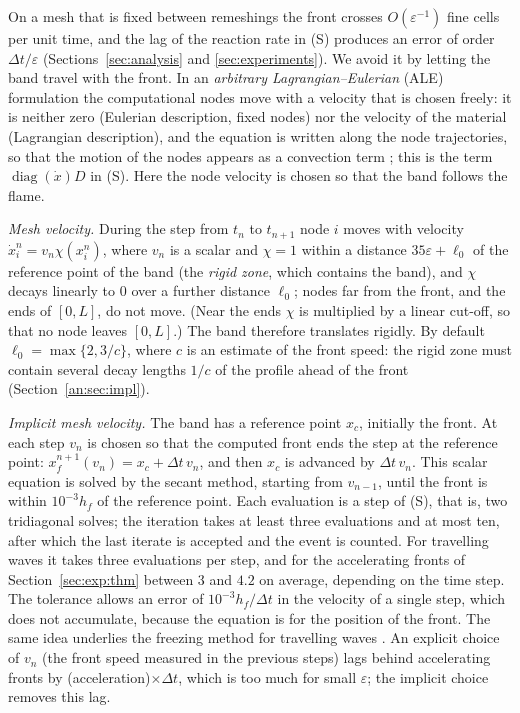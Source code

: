 \documentclass[11pt]{amsart}
\theoremstyle{definition}
\theoremstyle{remark}
\newcommand{\ve}{\varepsilon}
\begin{document}
On a mesh that is fixed between remeshings the front crosses $O(\ve^{-1})$ fine cells
per unit time, and the lag of the reaction rate in (S) produces an error of order
$\Delta t/\ve$ (Sections~\ref{sec:analysis} and \ref{sec:experiments}). We avoid it by letting the
band travel with the front. In an \emph{arbitrary Lagrangian--Eulerian} (ALE)
formulation the computational nodes move with a velocity that is chosen freely: it
is neither zero (Eulerian description, fixed nodes) nor the velocity of the
material (Lagrangian description), and the equation is written along the node
trajectories, so that the motion of the nodes appears as a convection term
\cite{HuangRussell2011}; this is the term $\operatorname{diag}(\dot x)D$ in (S). Here the node
velocity is chosen so that the band follows the flame.

\emph{Mesh velocity.} During the step from $t_n$ to $t_{n+1}$ node $i$ moves with
velocity $\dot x^n_i=v_n\chi(x^n_i)$, where $v_n$ is a scalar and $\chi=1$ within a distance
$35\ve+\ell_0$ of the reference point of the band (the \emph{rigid zone}, which contains the
band), and $\chi$ decays linearly to $0$ over a further distance $\ell_0$; nodes far from the front, and the ends
of $[0,L]$, do not move. (Near the ends $\chi$ is multiplied by a linear cut-off, so
that no node leaves $[0,L]$.) The band therefore translates rigidly. By default
$\ell_0=\max\{2,3/c\}$, where $c$ is an estimate of the front speed: the rigid zone
must contain several decay lengths $1/c$ of the profile ahead of the front
(Section~\ref{an:sec:impl}).

\emph{Implicit mesh velocity.} The band has a reference point $x_c$, initially the
front. At each step $v_n$ is chosen so that the computed front ends the step at
the reference point: $x_f^{n+1}(v_n)=x_c+\Delta t\,v_n$, and then $x_c$ is advanced by
$\Delta t\,v_n$. This scalar equation is solved by the secant method, starting from
$v_{n-1}$, until the front is within $10^{-3}h_f$ of the reference point. Each evaluation
is a step of (S), that is, two tridiagonal solves; the iteration takes at least three
evaluations and at most ten, after which the last iterate is accepted and the event is
counted. For travelling waves it takes three evaluations per step, and for the
accelerating fronts of Section~\ref{sec:exp:thm} between $3$ and $4.2$ on average,
depending on the time step. The tolerance allows an error of $10^{-3}h_f/\Delta t$ in the
velocity of a single step, which does not accumulate, because the equation is for the
position of the front. The same idea underlies the freezing method
for travelling waves \cite{BeynThummler2004}. An explicit choice of $v_n$ (the front
speed measured in the previous steps) lags behind accelerating fronts by
(acceleration)$\times\Delta t$, which is too much for small $\ve$; the implicit choice
removes this lag.
\end{document}
